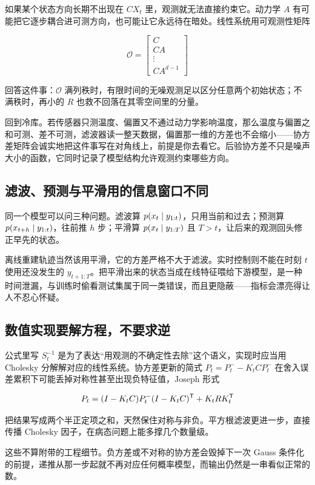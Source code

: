 如果某个状态方向长期不出现在 \(CX_t\) 里，观测就无法直接约束它。动力学 \(A\) 有可能把它逐步耦合进可测方向，也可能让它永远待在暗处。线性系统用可观测性矩阵

\[
\mathcal O=
\begin{bmatrix}C\\ CA\\ \vdots\\ CA^{d-1}\end{bmatrix}
\]

回答这件事：\(\mathcal O\) 满列秩时，有限时间的无噪观测足以区分任意两个初始状态；不满秩时，再小的 \(R\) 也救不回落在其零空间里的分量。

回到冷库。若传感器只测温度、偏置又不通过动力学影响温度，那么温度与偏置之和可测、差不可测，滤波器读一整天数据，偏置那一维的方差也不会缩小——协方差矩阵会诚实地把这件事写在对角线上，前提是你去看它。后验协方差不只是噪声大小的函数，它同时记录了模型结构允许观测约束哪些方向。

\subsection{滤波、预测与平滑用的信息窗口不同}

同一个模型可以问三种问题。滤波算 \(p(x_t\mid y_{1:t})\)，只用当前和过去；预测算 \(p(x_{t+h}\mid y_{1:t})\)，往前推 \(h\) 步；平滑算 \(p(x_t\mid y_{1:T})\) 且 \(T>t\)，让后来的观测回头修正早先的状态。

离线重建轨迹当然该用平滑，它的方差严格不大于滤波。实时控制则不能在时刻 \(t\) 使用还没发生的 \(y_{t+1:T}\)。把平滑出来的状态当成在线特征喂给下游模型，是一种时间泄漏，与训练时偷看测试集属于同一类错误，而且更隐蔽——指标会漂亮得让人不忍心怀疑。

\subsection{数值实现要解方程，不要求逆}

公式里写 \(S_t^{-1}\) 是为了表达``用观测的不确定性去除''这个语义，实现时应当用 Cholesky 分解解对应的线性系统。协方差更新的简式 \(P_t=P_t^--K_tCP_t^-\) 在舍入误差累积下可能丢掉对称性甚至出现负特征值，Joseph 形式

\[
P_t=(I-K_tC)P_t^-(I-K_tC)^{\mathsf{T}}+K_tRK_t^{\mathsf{T}}
\]

把结果写成两个半正定项之和，天然保住对称与非负。平方根滤波更进一步，直接传播 Cholesky 因子，在病态问题上能多撑几个数量级。

这些不算附带的工程细节。负方差或不对称的协方差会毁掉下一次 Gauss 条件化的前提，递推从那一步起就不再对应任何概率模型，而输出仍然是一串看似正常的数。

